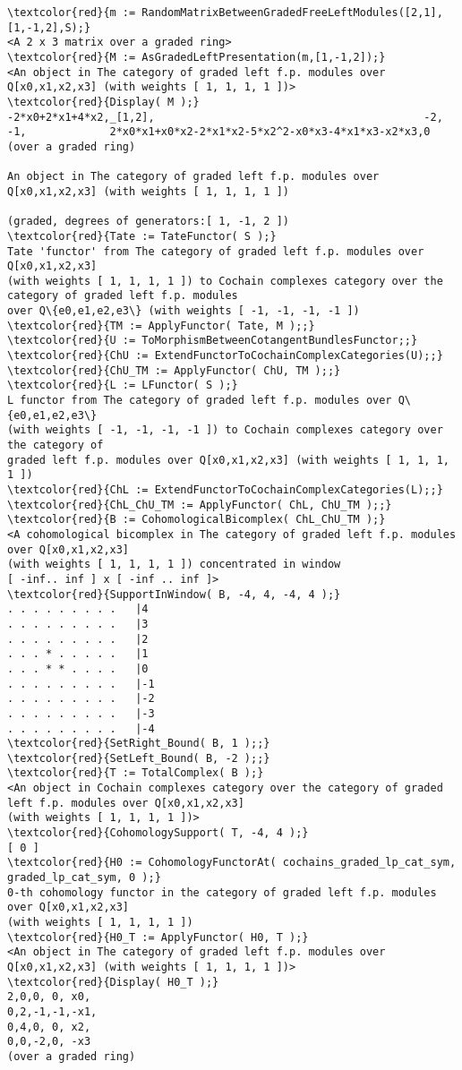 \documentclass[16pt,a4paper]{extarticle}
\theoremstyle{definition}
\begin{document}
\begin{Verbatim}[commandchars=\\\{\}]
\textcolor{red}{m := RandomMatrixBetweenGradedFreeLeftModules([2,1],[1,-1,2],S);}
<A 2 x 3 matrix over a graded ring>
\textcolor{red}{M := AsGradedLeftPresentation(m,[1,-1,2]);}
<An object in The category of graded left f.p. modules over Q[x0,x1,x2,x3] (with weights [ 1, 1, 1, 1 ])>
\textcolor{red}{Display( M );}
-2*x0+2*x1+4*x2,_[1,2],                                          -2,
-1,             2*x0*x1+x0*x2-2*x1*x2-5*x2^2-x0*x3-4*x1*x3-x2*x3,0  
(over a graded ring)

An object in The category of graded left f.p. modules over Q[x0,x1,x2,x3] (with weights [ 1, 1, 1, 1 ])

(graded, degrees of generators:[ 1, -1, 2 ])
\textcolor{red}{Tate := TateFunctor( S );}
Tate 'functor' from The category of graded left f.p. modules over Q[x0,x1,x2,x3] 
(with weights [ 1, 1, 1, 1 ]) to Cochain complexes category over the category of graded left f.p. modules 
over Q\{e0,e1,e2,e3\} (with weights [ -1, -1, -1, -1 ])
\textcolor{red}{TM := ApplyFunctor( Tate, M );;}
\textcolor{red}{U := ToMorphismBetweenCotangentBundlesFunctor;;}
\textcolor{red}{ChU := ExtendFunctorToCochainComplexCategories(U);;}
\textcolor{red}{ChU_TM := ApplyFunctor( ChU, TM );;}
\textcolor{red}{L := LFunctor( S );}
L functor from The category of graded left f.p. modules over Q\{e0,e1,e2,e3\} 
(with weights [ -1, -1, -1, -1 ]) to Cochain complexes category over the category of 
graded left f.p. modules over Q[x0,x1,x2,x3] (with weights [ 1, 1, 1, 1 ])
\textcolor{red}{ChL := ExtendFunctorToCochainComplexCategories(L);;}
\textcolor{red}{ChL_ChU_TM := ApplyFunctor( ChL, ChU_TM );;}
\textcolor{red}{B := CohomologicalBicomplex( ChL_ChU_TM );}
<A cohomological bicomplex in The category of graded left f.p. modules over Q[x0,x1,x2,x3] 
(with weights [ 1, 1, 1, 1 ]) concentrated in window 
[ -inf.. inf ] x [ -inf .. inf ]>
\textcolor{red}{SupportInWindow( B, -4, 4, -4, 4 );}
. . . . . . . . .   |4
. . . . . . . . .   |3
. . . . . . . . .   |2
. . . * . . . . .   |1
. . . * * . . . .   |0
. . . . . . . . .   |-1
. . . . . . . . .   |-2
. . . . . . . . .   |-3
. . . . . . . . .   |-4
\textcolor{red}{SetRight_Bound( B, 1 );;}
\textcolor{red}{SetLeft_Bound( B, -2 );;}
\textcolor{red}{T := TotalComplex( B );}
<An object in Cochain complexes category over the category of graded left f.p. modules over Q[x0,x1,x2,x3] 
(with weights [ 1, 1, 1, 1 ])>
\textcolor{red}{CohomologySupport( T, -4, 4 );}
[ 0 ]
\textcolor{red}{H0 := CohomologyFunctorAt( cochains_graded_lp_cat_sym, graded_lp_cat_sym, 0 );}
0-th cohomology functor in the category of graded left f.p. modules over Q[x0,x1,x2,x3] 
(with weights [ 1, 1, 1, 1 ])
\textcolor{red}{H0_T := ApplyFunctor( H0, T );}
<An object in The category of graded left f.p. modules over Q[x0,x1,x2,x3] (with weights [ 1, 1, 1, 1 ])>
\textcolor{red}{Display( H0_T );}
2,0,0, 0, x0, 
0,2,-1,-1,-x1,
0,4,0, 0, x2, 
0,0,-2,0, -x3 
(over a graded ring)


\end{Verbatim}
\end{document}
